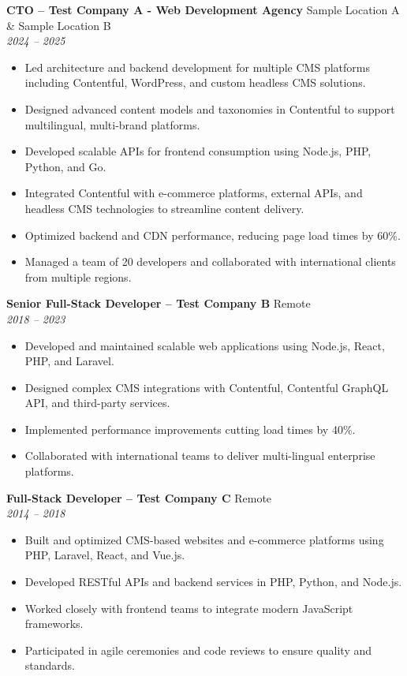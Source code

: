\documentclass[a4paper,10pt]{article}
\begin{document}
	\textbf{CTO – Test Company A - Web Development Agency} \hfill Sample Location A \& Sample Location B\\
	\textit{2024 -- 2025}
	\begin{itemize}
		\item Led architecture and backend development for multiple CMS platforms including Contentful, WordPress, and custom headless CMS solutions.
		\item Designed advanced content models and taxonomies in Contentful to support multilingual, multi-brand platforms.
		\item Developed scalable APIs for frontend consumption using Node.js, PHP, Python, and Go.
		\item Integrated Contentful with e-commerce platforms, external APIs, and headless CMS technologies to streamline content delivery.
		\item Optimized backend and CDN performance, reducing page load times by 60\%.
		\item Managed a team of 20 developers and collaborated with international clients from multiple regions.
	\end{itemize}
	
	\textbf{Senior Full-Stack Developer – Test Company B} \hfill Remote \\
	\textit{2018 -- 2023}
	\begin{itemize}
		\item Developed and maintained scalable web applications using Node.js, React, PHP, and Laravel.
		\item Designed complex CMS integrations with Contentful, Contentful GraphQL API, and third-party services.
		\item Implemented performance improvements cutting load times by 40\%.
		\item Collaborated with international teams to deliver multi-lingual enterprise platforms.
	\end{itemize}
	
	\textbf{Full-Stack Developer – Test Company C} \hfill Remote \\
	\textit{2014 -- 2018}
	\begin{itemize}
		\item Built and optimized CMS-based websites and e-commerce platforms using PHP, Laravel, React, and Vue.js.
		\item Developed RESTful APIs and backend services in PHP, Python, and Node.js.
		\item Worked closely with frontend teams to integrate modern JavaScript frameworks.
		\item Participated in agile ceremonies and code reviews to ensure quality and standards.
	\end{itemize}
	
\end{document}
